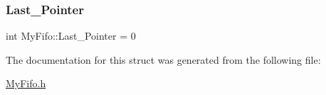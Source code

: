 \subsubsection{\texorpdfstring{Last\+\_\+\+Pointer}{Last\_Pointer}}
{\footnotesize\ttfamily int My\+Fifo\+::\+Last\+\_\+\+Pointer = 0}



The documentation for this struct was generated from the following file\+:\begin{DoxyCompactItemize}
\item 
\hyperlink{MyFifo_8h}{My\+Fifo.\+h}\end{DoxyCompactItemize}
